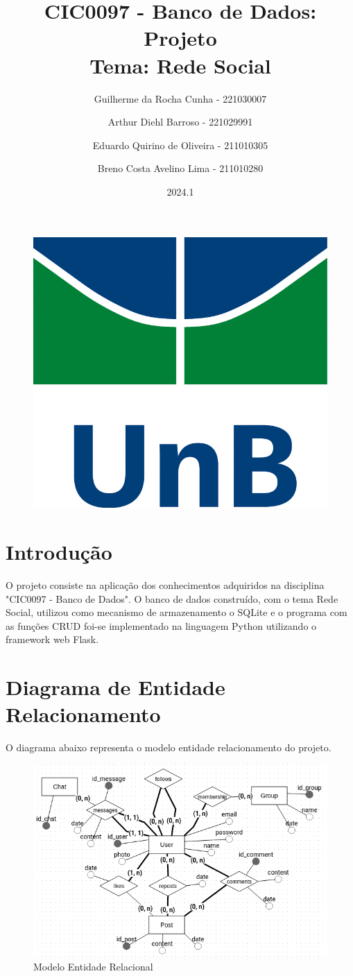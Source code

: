 \documentclass{article}
\title{CIC0097 - Banco de Dados: Projeto \\
        \large \textbf{Tema:} Rede Social}
\author{Guilherme da Rocha Cunha - 221030007 \\
        \and
        Arthur Diehl Barroso - 221029991 \\
        \and
        Eduardo Quirino de Oliveira - 211010305 \\
        \and 
        Breno Costa Avelino Lima - 211010280}
\date{2024.1}
\begin{document}
\pagestyle{fancy}

\maketitle

\begin{figure}[ht]
        \centering
        \includegraphics[width=.5\textwidth]{imagens/logo_unb.jpg}
\end{figure}

\newpage

\fancyhead{}
\fancyfoot[C]{\thepage}


\renewcommand*\contentsname{Sumário}
\tableofcontents

\newpage

\section{Introdução}
O projeto consiste na aplicação dos conhecimentos adquiridos na disciplina "CIC0097 - Banco de Dados". O banco de dados construído, com o tema Rede Social, utilizou como mecanismo de armazenamento o SQLite e o programa com as funções CRUD foi-se implementado na linguagem Python utilizando o framework web Flask.

\section{Diagrama de Entidade Relacionamento}
O diagrama abaixo representa o modelo entidade relacionamento do projeto.

\begin{figure}[!ht]
        \centering
        \includegraphics[width=1\textwidth]{imagens/mer.png}
        \caption{Modelo Entidade Relacional}
\end{figure}
\end{document}

